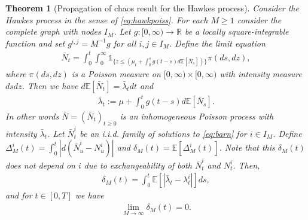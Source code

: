 \documentclass[10pt]{article}
\theoremstyle{plain}
\newtheorem{theorem}{Theorem}
\theoremstyle{definition}
\newcommand{\<}{\langle}
\renewcommand{\>}{\rangle}
\renewcommand{\(}{\left(}
\renewcommand{\)}{\right)}
\renewcommand{\[}{\left[}
\renewcommand{\]}{\right]}
\def \caratt {{\mathds{1}}}
\begin{document}
\begin{theorem}[Propagation of chaos result for the Hawkes process]\label{lemmaint}
Consider the Hawkes process in the sense of \eqref{eq:hawkpoiss}. For each $M\geq 1$ consider the
complete graph with nodes $I_{M}$. Let $g:[0,\infty)\rightarrow\mathbb{R}$ be a locally square-integrable function and set $g^{i,j}= M^{-1}g$ for all $i,j\in I_{M}$. Define the limit equation
\begin{align}\label{eq:barn}
\bar N_t = \int_0^t\int_0^\infty \caratt_{\{z\leq \left(\mu_t+\int_0^sg(t-s)d\mathbb{E}[\bar
N_s]\right)\}}\pi(ds,dz),
\end{align}
where $\pi(ds,dz)$ is a Poisson measure on $[0,\infty)\times [0,\infty)$ with intensity measure
$dsdz$. Then we have $d\mathbb{E}[\bar N_t] = \bar \lambda_tdt$ and
\begin{align}\label{eq:delambda}
\bar\lambda_t := \mu + \int_0^tg(t-s)d\mathbb{E}[\bar N_s].
\end{align}
In other words $\bar N=(\bar N_t)_{t\geq 0}$ is an inhomogeneous Poisson process with intensity $\bar \lambda_t$. Let $\bar N_t^i$ be an i.i.d. family of solutions to \eqref{eq:barn} for $i\in I_M$. Define $\Delta_M^i(t)=\int_0^t|d(\bar N_u^i-N_u^i)|$ and $\delta_M(t)=\mathbb{E}[\Delta^i_M(t)]$. Note that this $\delta_M(t)$ does not depend on $i$ due to exchangeability of both $\bar N_t^i$ and $N_t^i$. Then,
\begin{align}
\delta_M(t)=\int_0^t\mathbb{E}\left[\left|\bar\lambda_t-\lambda^i_t\right|\right]ds,
\end{align}
and for $t\in [0,T]$ we have
\begin{align}
\lim\limits_{M\rightarrow\infty}\delta_M(t)=0.
\end{align}
\end{theorem}
\end{document}
